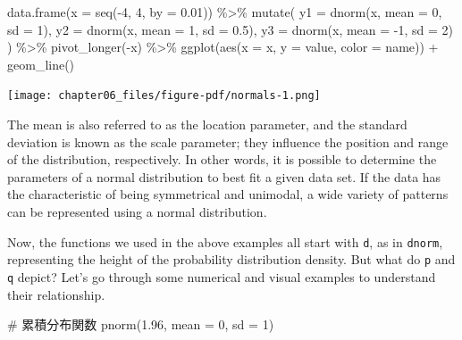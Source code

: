 \documentclass[
  a4paper,
]{book}
\newenvironment{Shaded}{\begin{snugshade}}{\end{snugshade}}
\newcommand{\AttributeTok}[1]{\textcolor[rgb]{0.40,0.45,0.13}{#1}}
\newcommand{\CommentTok}[1]{\textcolor[rgb]{0.37,0.37,0.37}{#1}}
\newcommand{\DecValTok}[1]{\textcolor[rgb]{0.68,0.00,0.00}{#1}}
\newcommand{\FloatTok}[1]{\textcolor[rgb]{0.68,0.00,0.00}{#1}}
\newcommand{\FunctionTok}[1]{\textcolor[rgb]{0.28,0.35,0.67}{#1}}
\newcommand{\NormalTok}[1]{\textcolor[rgb]{0.00,0.23,0.31}{#1}}
\newcommand{\SpecialCharTok}[1]{\textcolor[rgb]{0.37,0.37,0.37}{#1}}
\begin{document}
\begin{Shaded}
\begin{Highlighting}[]
\FunctionTok{data.frame}\NormalTok{(}\AttributeTok{x =} \FunctionTok{seq}\NormalTok{(}\SpecialCharTok{{-}}\DecValTok{4}\NormalTok{, }\DecValTok{4}\NormalTok{, }\AttributeTok{by =} \FloatTok{0.01}\NormalTok{)) }\SpecialCharTok{\%\textgreater{}\%}
  \FunctionTok{mutate}\NormalTok{(}
    \AttributeTok{y1 =} \FunctionTok{dnorm}\NormalTok{(x, }\AttributeTok{mean =} \DecValTok{0}\NormalTok{, }\AttributeTok{sd =} \DecValTok{1}\NormalTok{),}
    \AttributeTok{y2 =} \FunctionTok{dnorm}\NormalTok{(x, }\AttributeTok{mean =} \DecValTok{1}\NormalTok{, }\AttributeTok{sd =} \FloatTok{0.5}\NormalTok{),}
    \AttributeTok{y3 =} \FunctionTok{dnorm}\NormalTok{(x, }\AttributeTok{mean =} \SpecialCharTok{{-}}\DecValTok{1}\NormalTok{, }\AttributeTok{sd =} \DecValTok{2}\NormalTok{)}
\NormalTok{  ) }\SpecialCharTok{\%\textgreater{}\%}
  \FunctionTok{pivot\_longer}\NormalTok{(}\SpecialCharTok{{-}}\NormalTok{x) }\SpecialCharTok{\%\textgreater{}\%}
  \FunctionTok{ggplot}\NormalTok{(}\FunctionTok{aes}\NormalTok{(}\AttributeTok{x =}\NormalTok{ x, }\AttributeTok{y =}\NormalTok{ value, }\AttributeTok{color =}\NormalTok{ name)) }\SpecialCharTok{+}
  \FunctionTok{geom\_line}\NormalTok{()}
\end{Highlighting}
\end{Shaded}

\texttt{[image: chapter06\_files/figure-pdf/normals-1.png]}

The mean is also referred to as the location parameter, and the standard
deviation is known as the scale parameter; they influence the position
and range of the distribution, respectively. In other words, it is
possible to determine the parameters of a normal distribution to best
fit a given data set. If the data has the characteristic of being
symmetrical and unimodal, a wide variety of patterns can be represented
using a normal distribution.

Now, the functions we used in the above examples all start with
\texttt{d}, as in \texttt{dnorm}, representing the height of the
probability distribution density. But what do \texttt{p} and \texttt{q}
depict? Let's go through some numerical and visual examples to
understand their relationship.

\begin{Shaded}
\begin{Highlighting}[]
\CommentTok{\# 累積分布関数}
\FunctionTok{pnorm}\NormalTok{(}\FloatTok{1.96}\NormalTok{, }\AttributeTok{mean =} \DecValTok{0}\NormalTok{, }\AttributeTok{sd =} \DecValTok{1}\NormalTok{)}
\end{Highlighting}
\end{Shaded}
\end{document}
